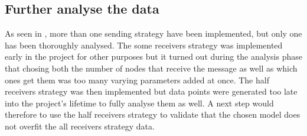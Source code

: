 \subsection{Further analyse the data}
As seen in , more than one sending strategy have been
implemented, but only one has been thoroughly analysed. The some receivers
strategy was implemented early in the project for other purposes but it turned
out during the analysis phase that chosing both the number of nodes that receive
the message as well as which ones get them was too many varying parameters
added at once. The half receivers strategy was then implemented but data points
were generated too late into the project's lifetime to fully analyse them as
well. A next step would therefore to use the half receivers strategy to validate
that the chosen model does not overfit the all receivers strategy data.
